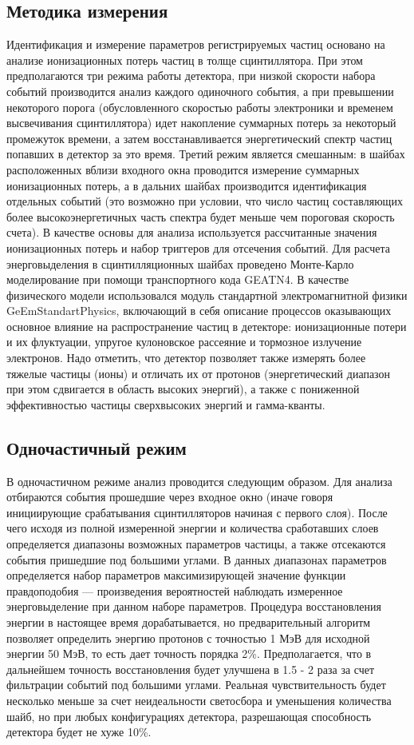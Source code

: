 \subsection{Методика измерения}


Идентификация и измерение параметров регистрируемых частиц основано на анализе ионизационных потерь частиц в толще сцинтиллятора.  При этом предполагаются три режима работы детектора, при низкой скорости набора событий производится анализ каждого одиночного события, а при превышении некоторого порога (обусловленного скоростью работы электроники и временем высвечивания сцинтиллятора) идет накопление суммарных потерь за некоторый промежуток времени, а затем восстанавливается энергетический спектр частиц попавших в детектор за это время. Третий режим является смешанным: в шайбах расположенных вблизи входного окна проводится измерение суммарных ионизационных потерь, а в дальних шайбах производится идентификация отдельных событий (это возможно при условии, что число частиц составляющих более высокоэнергетичных часть спектра будет меньше чем пороговая скорость счета). В качестве основы для анализа используется рассчитанные значения ионизационных потерь и набор триггеров для отсечения событий. Для расчета энерговыделения в сцинтилляционных шайбах проведено Монте-Карло моделирование при помощи транспортного кода GEATN4.  В качестве физического модели использовался модуль стандартной электромагнитной физики GeEmStandartPhysics, включающий в себя описание процессов оказывающих основное влияние на распространение частиц в детекторе: ионизационные потери и их флуктуации, упругое кулоновское рассеяние и тормозное излучение электронов.
Надо отметить, что детектор позволяет также измерять более тяжелые частицы (ионы) и отличать их от протонов (энергетический диапазон при этом сдвигается в область высоких энергий), а также с пониженной эффективностью частицы сверхвысоких энергий и гамма-кванты.
\subsection{Одночастичный режим}
В одночастичном режиме анализ проводится следующим образом. Для анализа отбираются события прошедшие через входное окно (иначе говоря инициирующие срабатывания сцинтилляторов начиная с первого слоя). После чего исходя из полной измеренной энергии и количества сработавших слоев определяется диапазоны возможных параметров частицы, а также отсекаются события пришедшие под большими углами. В данных диапазонах параметров определяется набор параметров максимизирующей значение функции правдоподобия --- произведения вероятностей наблюдать измеренное энерговыделение при данном наборе параметров. Процедура восстановления энергии в настоящее время дорабатывается, но предварительный алгоритм позволяет определить энергию протонов с точностью 1 МэВ для исходной энергии 50 МэВ, то есть дает точность порядка 2\%. Предполагается, что в дальнейшем точность восстановления будет улучшена в 1.5 - 2 раза за счет фильтрации событий под большими углами. Реальная чувствительность будет несколько меньше за счет неидеальности светосбора и уменьшения количества шайб, но при любых конфигурациях детектора, разрешающая способность детектора будет не хуже 10\%.

